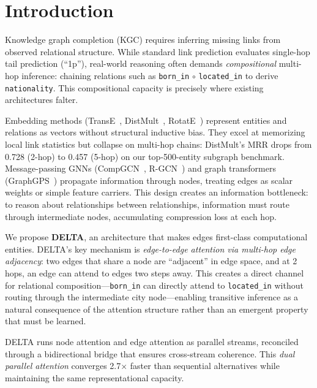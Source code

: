 \documentclass{article}
\begin{document}
\section{Introduction}
\label{sec:intro}

Knowledge graph completion (KGC) requires inferring missing links from observed relational structure. While standard link prediction evaluates single-hop tail prediction (``1p''), real-world reasoning often demands \emph{compositional} multi-hop inference: chaining relations such as \texttt{born\_in} $\circ$ \texttt{located\_in} to derive \texttt{nationality}. This compositional capacity is precisely where existing architectures falter.

Embedding methods (TransE~\cite{bordes2013translating}, DistMult~\cite{yang2015embedding}, RotatE~\cite{sun2019rotate}) represent entities and relations as vectors without structural inductive bias. They excel at memorizing local link statistics but collapse on multi-hop chains: DistMult's MRR drops from 0.728 (2-hop) to 0.457 (5-hop) on our top-500-entity subgraph benchmark. Message-passing GNNs (CompGCN~\cite{vashishth2019composition}, R-GCN~\cite{schlichtkrull2018modeling}) and graph transformers (GraphGPS~\cite{rampavsek2022recipe}) propagate information through nodes, treating edges as scalar weights or simple feature carriers. This design creates an information bottleneck: to reason about relationships between relationships, information must route through intermediate nodes, accumulating compression loss at each hop.

We propose \textbf{DELTA}, an architecture that makes edges first-class computational entities. DELTA's key mechanism is \emph{edge-to-edge attention via multi-hop edge adjacency}: two edges that share a node are ``adjacent'' in edge space, and at 2 hops, an edge can attend to edges two steps away. This creates a direct channel for relational composition---\texttt{born\_in} can directly attend to \texttt{located\_in} without routing through the intermediate city node---enabling transitive inference as a natural consequence of the attention structure rather than an emergent property that must be learned.

DELTA runs node attention and edge attention as parallel streams, reconciled through a bidirectional bridge that ensures cross-stream coherence. This \emph{dual parallel attention} converges 2.7$\times$ faster than sequential alternatives while maintaining the same representational capacity.
\end{document}
